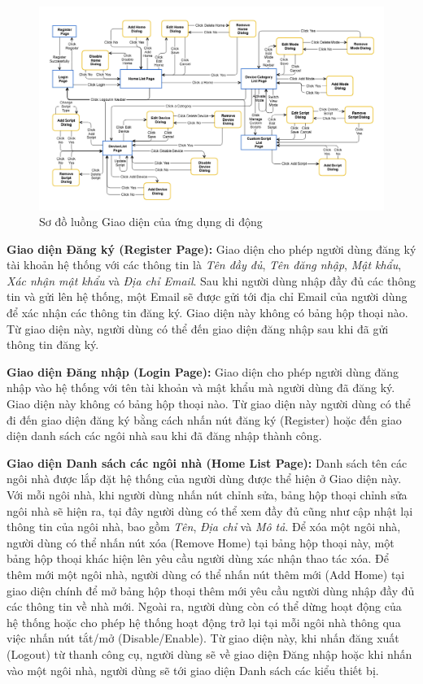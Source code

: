 \documentclass[12pt,a4paper,oneside]{extbook}
\begin{document}
\begin{figure}[h]
  \centering
     \includegraphics[width=16cm]{5-UI-Flow}
  \caption{Sơ đồ luồng Giao diện của ứng dụng di động}\label{fig:5-UI-Flow}
\end{figure}

\textbf{Giao diện Đăng ký (Register Page):} Giao diện cho phép người dùng đăng ký tài khoản hệ thống với các thông tin là \textit{Tên đầy đủ}, \textit{Tên đăng nhập}, \textit{Mật khẩu}, \textit{Xác nhận mật khẩu} và \textit{Địa chỉ Email}. Sau khi người dùng nhập đầy đủ các thông tin và gửi lên hệ thống, một Email sẽ được gửi tới địa chỉ Email của người dùng để xác nhận các thông tin đăng ký. Giao diện này không có bảng hộp thoại nào. Từ giao diện này, người dùng có thể đến giao diện đăng nhập sau khi đã gửi thông tin đăng ký.

\textbf{Giao diện Đăng nhập (Login Page):} Giao diện cho phép người dùng đăng nhập vào hệ thống với tên tài khoản và mật khẩu mà người dùng đã đăng ký. Giao diện này không có bảng hộp thoại nào. Từ giao diện này người dùng có thể đi đến giao diện đăng ký bằng cách nhấn nút đăng ký (Register) hoặc đến giao diện danh sách các ngôi nhà sau khi đã đăng nhập thành công.

\textbf{Giao diện Danh sách các ngôi nhà (Home List Page):} Danh sách tên các ngôi nhà được lắp đặt hệ thống của người dùng được thể hiện ở Giao diện này. Với mỗi ngôi nhà, khi người dùng nhấn nút chỉnh sửa, bảng hộp thoại chỉnh sửa ngôi nhà sẽ hiện ra, tại đây người dùng có thể xem đầy đủ cũng như cập nhật lại thông tin của ngôi nhà, bao gồm \textit{Tên}, \textit{Địa chỉ} và \textit{Mô tả}. Để xóa một ngôi nhà, người dùng có thể nhấn nút xóa (Remove Home) tại bảng hộp thoại này, một bảng hộp thoại khác hiện lên yêu cầu người dùng xác nhận thao tác xóa. Để thêm mới một ngôi nhà, người dùng có thể nhấn nút thêm mới (Add Home) tại giao diện chính để mở bảng hộp thoại thêm mới yêu cầu người dùng nhập đầy đủ các thông tin về nhà mới. Ngoài ra, người dùng còn có thể dừng hoạt động của hệ thống hoặc cho phép hệ thống hoạt động trở lại tại mỗi ngôi nhà thông qua việc nhấn nút tắt/mở (Disable/Enable). Từ giao diện này, khi nhấn đăng xuất (Logout) từ thanh công cụ, người dùng sẽ về giao diện Đăng nhập hoặc khi nhấn vào một ngôi nhà, người dùng sẽ tới giao diện Danh sách các kiểu thiết bị.
\end{document}
